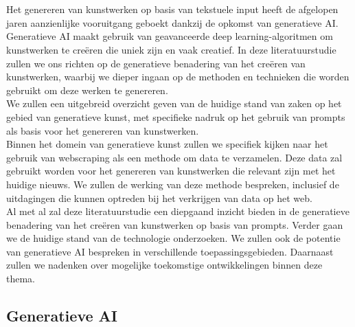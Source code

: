 \chapter{}%
\label{ch:stand-van-zaken}



Het genereren van kunstwerken op basis van tekstuele input heeft de afgelopen jaren aanzienlijke vooruitgang geboekt dankzij de opkomst van generatieve AI. Generatieve AI maakt gebruik van geavanceerde deep learning-algoritmen om kunstwerken te creëren die uniek zijn en vaak creatief. In deze literatuurstudie zullen we ons richten op de generatieve benadering van het creëren van kunstwerken, waarbij we dieper ingaan op de methoden en technieken die worden gebruikt om deze werken te genereren. \\

We zullen een uitgebreid overzicht geven van de huidige stand van zaken op het gebied van generatieve kunst, met specifieke nadruk op het gebruik van prompts als basis voor het genereren van kunstwerken. \\

Binnen het domein van generatieve kunst zullen we specifiek kijken naar het gebruik van webscraping als een methode om data te verzamelen. Deze data zal gebruikt worden voor het genereren van kunstwerken die relevant zijn met het huidige nieuws. We zullen de werking van deze methode bespreken, inclusief de uitdagingen die kunnen optreden bij het verkrijgen van data op het web. \\

Al met al zal deze literatuurstudie een diepgaand inzicht bieden in de generatieve benadering van het creëren van kunstwerken op basis van prompts. Verder gaan we de huidige stand van de technologie onderzoeken. We zullen ook de potentie van generatieve AI bespreken in verschillende toepassingsgebieden. Daarnaast zullen we nadenken over mogelijke toekomstige ontwikkelingen binnen deze thema. 
\pagebreak


\section{Generatieve AI}

